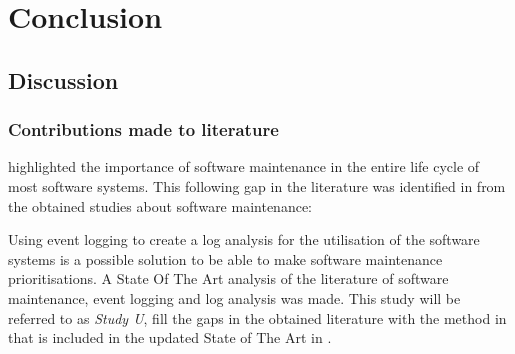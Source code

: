 \chapter{Conclusion}
\label{chap:4}

\section{Discussion}

\subsection{Contributions made to literature}
 highlighted the importance of software maintenance in the entire life cycle of most software systems. This following gap in the literature was identified in  from the obtained studies about software maintenance: 

\begin{center}
	\begin{tcolorbox}[colback=lightgray, colframe=black, sharp corners=all, arc=4pt]
		\begin{minipage}{\textwidth}
			\RaggedRight\textit{\studyGap}
		\end{minipage}
	\end{tcolorbox}
\end{center}

Using event logging to create a log analysis for the utilisation of the software systems is a possible solution to be able to make software maintenance prioritisations. A State Of The Art analysis of  the literature of software maintenance, event logging and log analysis was made. This study will be referred to as \textit{Study U}, fill the gaps in the obtained literature with the method in  that is included in the updated State of The Art in .

